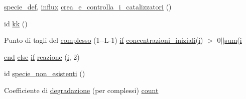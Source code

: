 \begin{DoxyCompactItemize}
\hyperlink{a00110_a85d979dc881d9a49537b0f43daa2b360}{specie\+\_\+def}, \hyperlink{a00107_a902e747aeec6b345d3a057099152f41f}{influx} \hyperlink{a00110_a369160212da6ddc667d7c8e245ed8b24}{crea\+\_\+e\+\_\+controlla\+\_\+i\+\_\+catalizzatori} ()
\item 
id \hyperlink{a00110_a262053c6a2b2b257b33309d12f8f7ba7}{kk} ()
\item 
Punto di tagli del \hyperlink{a00110_ad4d1a2311b23c0f860b99297ddc57214}{complesso} (1-\/-\/L-\/1) \hyperlink{a00030_a01d55766b8058903dd360b4bda71f9f5}{if} \hyperlink{a00103_a89801fa89eee3ba40f6610f290d6f6c3}{concentrazioni\+\_\+iniziali}(\hyperlink{a00113_ad3efca1ea6e3333daf30719ee0501862}{i}) $>$ 0$\vert$$\vert$\hyperlink{a00106_a59a869fb2b28d56dacd91c09e1dffc8d}{sum}(\hyperlink{a00113_ad3efca1ea6e3333daf30719ee0501862}{i}
\item 
\hyperlink{a00025_afb358f48b1646c750fb9da6c6585be2b}{end} \hyperlink{a00031_af5946383720aa572eb93e1e63afc23c2}{else} \hyperlink{a00030_a01d55766b8058903dd360b4bda71f9f5}{if} \hyperlink{a00110_a65cf6e12ba9a8c10222f3f1f71f7c95f}{reazione} (\hyperlink{a00113_ad3efca1ea6e3333daf30719ee0501862}{i}, 2)
\item 
id \hyperlink{a00110_adfcfd2749a68fa87ece8ec3caa194b3d}{specie\+\_\+non\+\_\+esistenti} ()
\item 
Coefficiente di \hyperlink{a00110_a43a55a4e9faae78b56ddd9e7ca41ba42}{degradazione} (per complessi) \hyperlink{a00110_aa0a4866d2600caeb20cfacee8eefc922}{count}
\end{DoxyCompactItemize}
